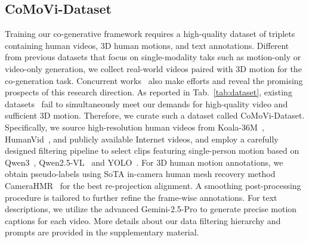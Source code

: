 \subsection{CoMoVi-Dataset}
\label{sec:dataset}

Training our co-generative framework requires a high-quality dataset of triplets containing human videos, 3D human motions, and text annotations. Different from previous datasets that focus on single-modality taks such as motion-only or video-only generation, we collect real-world videos paired with 3D motion for the co-generation task. Concurrent works~\cite{lin2025vimogen,yang2025echomotion} also make efforts and reveal the promising prospects of this research direction. As reported in Tab.~\ref{tab:dataset}, existing datasets~\cite{lin2023motionx,wang2024humanvid,wang2025humandreamer,lin2025vimogen,ren2023lip,zhao2024imhoi} fail to simultaneously meet our demands for high-quality video and sufficient 3D motion. Therefore, we curate such a dataset called CoMoVi-Dataset. Specifically, we source high-resolution human videos from Koala-36M~\cite{wang2025koala}, HumanVid~\cite{wang2024humanvid}, and publicly available Internet videos, and employ a carefully designed filtering pipeline to select clips featuring single-person motion based on Qwen3~\cite{qwen3}, Qwen2.5-VL~\cite{qwen2.5} and YOLO~\cite{redmon2016yolo}. For 3D human motion annotations, we obtain pseudo-labels using SoTA in-camera human mesh recovery method CameraHMR~\cite{patel2025camerahmr} for the best re-projection alignment. A smoothing post-processing procedure is tailored to further refine the frame-wise annotations. For text descriptions, we utilize the advanced Gemini-2.5-Pro to generate precise motion captions for each video. More details about our data filtering hierarchy and prompts are provided in the supplementary material.